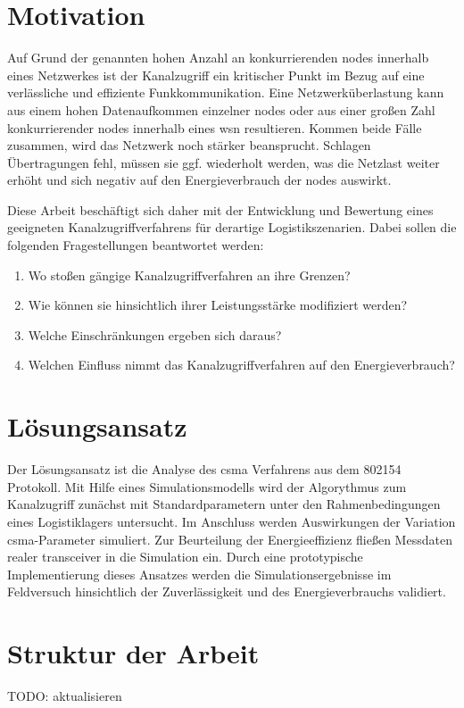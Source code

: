 \section{Motivation}
Auf Grund der genannten hohen Anzahl an konkurrierenden \glspl{node} innerhalb eines Netzwerkes ist der Kanalzugriff ein kritischer Punkt im Bezug auf eine verlässliche und effiziente Funkkommunikation. Eine Netzwerküberlastung kann aus einem hohen Datenaufkommen einzelner \glspl{node} oder aus einer großen Zahl konkurrierender \glspl{node} innerhalb eines \ac{wsn} resultieren. Kommen beide Fälle zusammen, wird das Netzwerk noch stärker beansprucht. Schlagen Übertragungen fehl, müssen sie ggf. wiederholt werden, was die Netzlast weiter erhöht und sich negativ auf den Energieverbrauch der \glspl{node} auswirkt.

Diese Arbeit beschäftigt sich daher mit der Entwicklung und Bewertung eines geeigneten Kanalzugriffverfahrens für derartige Logistikszenarien.
Dabei sollen die folgenden Fragestellungen beantwortet werden:
\begin{enumerate}
	\item Wo stoßen gängige Kanalzugriffverfahren an ihre Grenzen?
	\item Wie können sie hinsichtlich ihrer Leistungsstärke modifiziert werden?
	\item Welche Einschränkungen ergeben sich daraus?
	\item Welchen Einfluss nimmt das Kanalzugriffverfahren auf den Energieverbrauch?
\end{enumerate}

\section{Lösungsansatz}
Der Lösungsansatz ist die Analyse des \acf{csma} Verfahrens aus dem \gls{802154} Protokoll. Mit Hilfe eines Simulationsmodells wird der Algorythmus zum Kanalzugriff zunächst mit Standardparametern unter den Rahmenbedingungen eines Logistiklagers untersucht. Im Anschluss werden Auswirkungen der Variation  \acs{csma}-Parameter simuliert. Zur Beurteilung der Energieeffizienz fließen Messdaten realer \gls{transceiver} in die Simulation ein. Durch eine prototypische Implementierung dieses Ansatzes werden die Simulationsergebnisse im Feldversuch hinsichtlich der Zuverlässigkeit und des Energieverbrauchs validiert.

\section{Struktur der Arbeit}
TODO: aktualisieren

